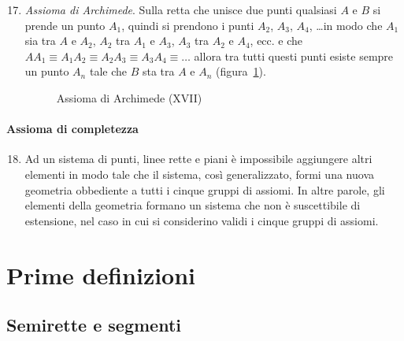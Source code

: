 \begin{enumerate}[label=\Roman{*}.]
\setcounter{enumi}{16}
\item \emph{Assioma di Archimede}. Sulla retta che unisce due punti 
qualsiasi $A$ e $B$ si prende un punto $A_1$, quindi si prendono i 
punti $A_2$, $A_3$, $A_4$, \ldots in modo che $A_1$ sia tra $A$ e 
$A_2$, $A_2$ tra $A_1$ e $A_3$, $A_3$ tra $A_2$ e $A_4$, ecc. e che  
$AA_1\equiv A_1A_2\equiv A_2A_3\equiv A_3A_4\equiv\ldots$ allora tra 
tutti questi punti esiste sempre un punto $A_n$ tale che $B$ sta tra 
$A$ e $A_n$ (figura~\ref{fig:1.11}).

\begin{inaccessibleblock}
 \begin{figure}[bth]
 \centering 
 \caption{Assioma di Archimede (XVII)}\label{fig:1.11}
\end{figure}
\end{inaccessibleblock}
\end{enumerate}

\paragraph{Assioma di completezza}

\begin{enumerate}[label=\Roman{*}.]
\setcounter{enumi}{17}
\item Ad un sistema di punti, linee rette e piani è impossibile 
aggiungere altri elementi in modo tale che il sistema, così 
generalizzato, formi una nuova geometria obbediente a tutti i cinque 
gruppi di assiomi. In altre parole, gli elementi della geometria 
formano un sistema che non è suscettibile di estensione, nel caso in 
cui si considerino validi i cinque gruppi di assiomi.
\end{enumerate}

\vspazio\ovalbox{\risolvii \ref{ese:1.33}, \ref{ese:1.34}, 
\ref{ese:1.36}, \ref{ese:1.37}, \ref{ese:1.38}, \ref{ese:1.39}, 
\ref{ese:1.40}, \ref{ese:1.41}, \ref{ese:1.42}}


\section{Prime definizioni}\label{sect:prime_definizioni}

\subsection{Semirette e segmenti}

